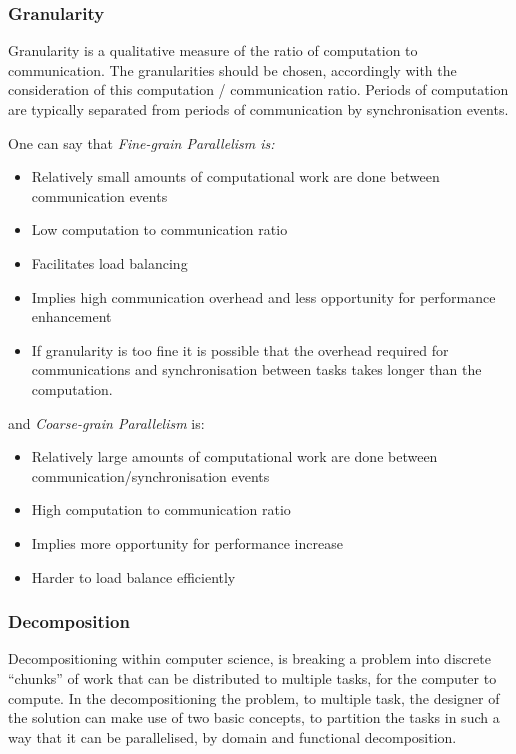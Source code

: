 \subsubsection{Granularity}
Granularity is a qualitative measure of the ratio of computation to communication. The granularities should be chosen, accordingly with the consideration of this computation / communication ratio. Periods of computation are typically separated from periods of communication by synchronisation events.

One can say that \emph{Fine-grain Parallelism is:}

\begin{itemize}
\item Relatively small amounts of computational work are done between communication events
\item Low computation to communication ratio
\item Facilitates load balancing
\item Implies high communication overhead and less opportunity for performance enhancement
\item If granularity is too fine it is possible that the overhead required for communications and synchronisation between tasks takes longer than the computation.
\end{itemize}

and \emph{Coarse-grain Parallelism} is:

\begin{itemize}
\item Relatively large amounts of computational work are done between communication/synchronisation events
\item High computation to communication ratio
\item Implies more opportunity for performance increase
\item Harder to load balance efficiently
\end{itemize}

\subsubsection{Decomposition} 
Decompositioning within computer science, is breaking a problem into discrete \enquote{chunks} of work that can be distributed to multiple tasks, for the computer to compute. In the decompositioning the problem, to multiple task, the designer of the solution can make use of two basic concepts, to partition the tasks in such a way that it can be parallelised, by domain and functional decomposition.

